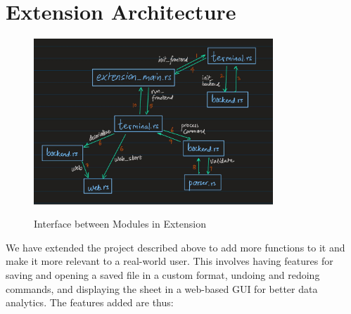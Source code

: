 \documentclass{article}
\begin{document}
\section{Extension Architecture}
\begin{figure}[t]
    \centering
    {{\includegraphics[width=9cm]{extension.jpg}}}
    \caption{Interface between Modules in Extension}
    \end{figure}
We have extended the project described above to add more functions to it and make it more relevant to a real-world user. This involves having features for saving and opening a saved file in a custom format, undoing and redoing commands, and displaying the sheet in a web-based GUI for better data analytics.
The features added are thus:
\end{document}
